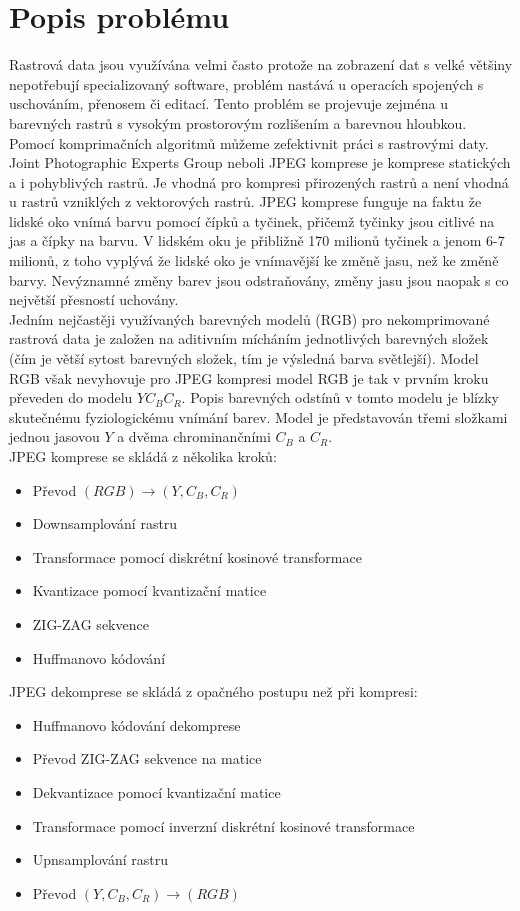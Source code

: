 \section{Popis problému}
Rastrová data jsou využívána velmi často protože na zobrazení dat s velké většiny nepotřebují specializovaný software, problém nastává u operacích spojených s uschováním, přenosem či editací. Tento problém se projevuje zejména u barevných rastrů s vysokým prostorovým rozlišením a barevnou hloubkou. Pomocí komprimačních algoritmů můžeme zefektivnit práci s rastrovými daty.
Joint Photographic Experts Group neboli JPEG komprese je komprese statických a i pohyblivých rastrů. Je vhodná pro kompresi přirozených rastrů a není vhodná u rastrů vzniklých z vektorových rastrů. JPEG komprese funguje na faktu že lidské oko vnímá barvu pomocí čípků a tyčinek, přičemž tyčinky jsou citlivé na jas a čípky na barvu. V lidském oku je přibližně 170 milionů tyčinek a jenom 6-7 milionů, z toho vyplývá že lidské oko je vnímavější ke změně jasu, než ke změně barvy. Nevýznamné změny barev jsou odstraňovány, změny jasu jsou naopak s co největší přesností uchovány\cite{pIDhmNtdwMgbcGoe}.\\
Jedním nejčastěji využívaných barevných modelů (RGB) pro nekomprimované rastrová data je založen na aditivním mícháním jednotlivých barevných složek (čím je větší sytost barevných složek, tím je výsledná barva světlejší). Model RGB však nevyhovuje pro JPEG kompresi model RGB je tak v prvním kroku převeden do modelu $YC_BC_R$. Popis barevných odstínů v tomto modelu je blízky skutečnému fyziologickému vnímání barev. Model je představován třemi složkami jednou jasovou $Y$ a dvěma chrominančními $C_B$ a $C_R$\cite{pIDhmNtdwMgbcGoe}.\\
JPEG komprese se skládá z několika kroků\cite{pIDhmNtdwMgbcGoe}:
\begin{itemize}
    \item Převod $(RGB) \longrightarrow (Y,C_B,C_R)$
    \item Downsamplování rastru
    \item Transformace pomocí diskrétní kosinové transformace
    \item Kvantizace pomocí kvantizační matice
    \item ZIG-ZAG sekvence
    \item Huffmanovo kódování
\end{itemize}
JPEG dekomprese se skládá z opačného postupu než při kompresi\cite{pIDhmNtdwMgbcGoe}:
\begin{itemize}
    \item Huffmanovo kódování dekomprese
    \item Převod ZIG-ZAG sekvence na matice
    \item Dekvantizace pomocí kvantizační matice
    \item Transformace pomocí inverzní diskrétní kosinové transformace
    \item Upnsamplování rastru
    \item Převod $(Y,C_B,C_R) \longrightarrow (RGB)$
\end{itemize}
